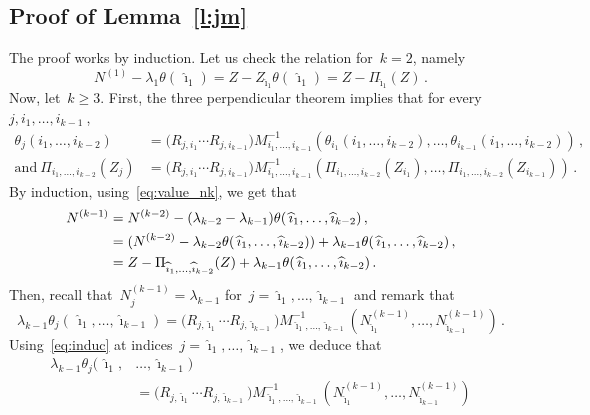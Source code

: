 \documentclass[final,numbib]{imaiai}%
\numberwithin{equation}{section}
\renewcommand{\hat}{\widehat}
\def\\bUnif{\text{\bUnif}}
\newcommand{\<}{\langle}
\renewcommand{\>}{\rangle}
\newcommand{\1}{\mathds{1}}
\begin{document}
{\subsection{Proof of Lemma~\ref{l:jm}}
\label{proof:ydc1}
The proof works by induction. Let us check the relation for~$k=2$, namely
\[
 N^{(1)} -\lambda_{1} \theta(\,\hat \imath_1)=Z-Z_{\hat \imath_1} \theta(\,\hat \imath_1)=Z - \Pi_{\hat \imath_1}  (Z)\,.
\]
Now, let~$k\geq 3$. First, the three perpendicular theorem  implies  that  for every~$j,  i_1,\ldots, i_{k-1}~$,
\begin{align*}
	\theta_j(i_1, \ldots ,  i_{k-2})
   	&= \big(R_{j,i_1} \cdots R_{j,i_{k-1}}  \big)M^{-1}_{i_1,\ldots, i_{k-1}}   
		( 
 			\theta_{i_1}(i_1, \ldots ,  i_{k-2}),\ldots,\theta_{i_{k-1}} (i_1,\ldots, i_{k-2})  
  		)\,,\\
	\mathrm{and}\ \Pi_{ i_1,\ldots, i_{k-2}}  (Z_j)
	&= \big(R_{j,i_1} \cdots R_{j,i_{k-1}}  \big)M^{-1}_{i_1,\ldots, i_{k-1}}   
		( 
  			\Pi_{ i_1,\ldots, i_{k-2}}  (Z_{i_1}),\ldots,\Pi_{ i_1,\ldots, i_{k-2}}  (Z_{i_{k-1}})  
  		)\,.
\end{align*}
By induction, using~\eqref{eq:value_nk}, we get that
\begin{align}
N^{(k-1)}&=N^{(k-2)}-(\lambda_{k-2}-\lambda_{k-1}) \theta(\,\hat \imath_1,\ldots, \hat \imath_{k-2})\,,\notag
\\
&=
(N^{(k-2)}-\lambda_{k-2} \theta(\,\hat \imath_1,\ldots, \hat \imath_{k-2}))+\lambda_{k-1}\theta(\,\hat \imath_1,\ldots, \hat \imath_{k-2})\,,\notag\\
&=
Z  - \Pi_{\hat \imath_1,\ldots,\hat \imath_{k-2}}  (Z)+\lambda_{k-1} \theta(\,\hat \imath_1,\ldots, \hat \imath_{k-2})\,.\label{eq:induc}
\end{align}
Then, recall that~$N^{(k-1)}_j = \lambda_{k-1}$ for~$j=\hat \imath_1,\ldots,\hat \imath_{k-1}$ and remark that
\[
\lambda_{k-1} \theta_j(\,\hat \imath_1,\ldots,\hat \imath_{k-1}) 
= \big(R_{j,\hat \imath_1} \cdots R_{j,\hat \imath_{k-1}}  \big)M^{-1}_{\hat \imath_1,\ldots, \hat \imath_{k-1}} 
 (N^{(k-1)}_{\hat \imath_1},\ldots,N^{(k-1)}_{\hat \imath_{k-1}})\,.
\]
Using~\eqref{eq:induc} at indices~$j=\hat \imath_1,\ldots,\hat \imath_{k-1}$, we deduce that
\begin{align*}
\lambda_{k-1} \theta_j(\,\hat \imath_1,&\ldots,\hat \imath_{k-1}) \\
&
= \big(R_{j,\hat \imath_1} \cdots R_{j,\hat \imath_{k-1}}  \big)M^{-1}_{\hat \imath_1,\ldots, \hat \imath_{k-1}} 
 (N^{(k-1)}_{\hat \imath_1},\ldots,N^{(k-1)}_{\hat \imath_{k-1}})
\\

\end{align*}}
\end{document}
